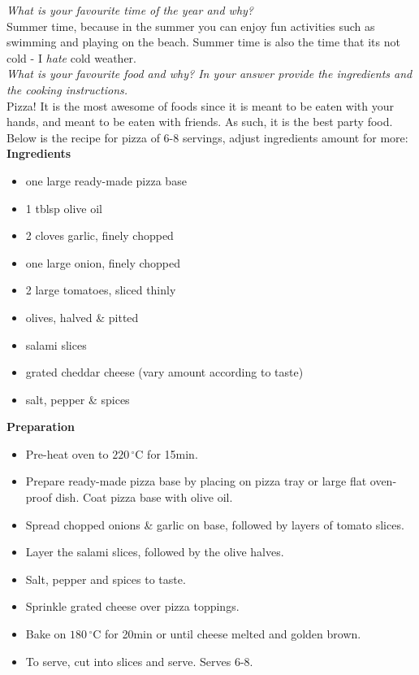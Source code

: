 \documentclass[a4paper,12pt]{article}
\begin{document}
\textit{What is your favourite time of the year and why?}\\
Summer time, because in the summer you can enjoy fun activities such as swimming and playing on the beach. Summer time is also the time that its not cold - I \emph{hate} cold weather.
\\

\textit{What is your favourite food and why? In your answer provide the ingredients and the cooking instructions.}\\
Pizza! It is the most awesome of foods since it is meant to be eaten with your hands, and meant to be eaten with friends. As such, it is the best party food. Below is the recipe for pizza of 6-8 servings, adjust ingredients amount for more: 
\\

\textbf{Ingredients}
\begin{itemize}
  \item one large ready-made pizza base
  \item 1 tblsp olive oil
  \item 2 cloves garlic, finely chopped
  \item one large onion, finely chopped
  \item 2 large tomatoes, sliced thinly
  \item olives, halved \& pitted
  \item salami slices
  \item grated cheddar cheese (vary amount according to taste)
  \item salt, pepper \& spices
\end{itemize}

\textbf{Preparation}
\begin{itemize}
  \item Pre-heat oven to $220\,^{\circ}\mathrm{C}$ for 15min.
  \item Prepare ready-made pizza base by placing on pizza tray or large flat oven-proof dish. Coat pizza base with olive oil.
  \item Spread chopped onions \& garlic on base, followed by layers of tomato slices.
  \item Layer the salami slices, followed by the olive halves.
  \item Salt, pepper and spices to taste.
  \item Sprinkle grated cheese over pizza toppings.
  \item Bake on $180\,^{\circ}\mathrm{C}$ for 20min or until cheese melted and golden brown.
  \item To serve, cut into slices and serve. Serves 6-8.
\end{itemize}
\end{document}
